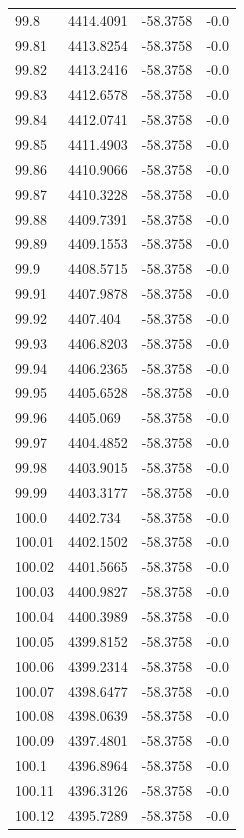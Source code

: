 \begin{table}[H]
\begin{tabular}{llll}
99.8 & 4414.4091 & -58.3758 & -0.0 \\
99.81 & 4413.8254 & -58.3758 & -0.0 \\
99.82 & 4413.2416 & -58.3758 & -0.0 \\
99.83 & 4412.6578 & -58.3758 & -0.0 \\
99.84 & 4412.0741 & -58.3758 & -0.0 \\
99.85 & 4411.4903 & -58.3758 & -0.0 \\
99.86 & 4410.9066 & -58.3758 & -0.0 \\
99.87 & 4410.3228 & -58.3758 & -0.0 \\
99.88 & 4409.7391 & -58.3758 & -0.0 \\
99.89 & 4409.1553 & -58.3758 & -0.0 \\
99.9 & 4408.5715 & -58.3758 & -0.0 \\
99.91 & 4407.9878 & -58.3758 & -0.0 \\
99.92 & 4407.404 & -58.3758 & -0.0 \\
99.93 & 4406.8203 & -58.3758 & -0.0 \\
99.94 & 4406.2365 & -58.3758 & -0.0 \\
99.95 & 4405.6528 & -58.3758 & -0.0 \\
99.96 & 4405.069 & -58.3758 & -0.0 \\
99.97 & 4404.4852 & -58.3758 & -0.0 \\
99.98 & 4403.9015 & -58.3758 & -0.0 \\
99.99 & 4403.3177 & -58.3758 & -0.0 \\
100.0 & 4402.734 & -58.3758 & -0.0 \\
100.01 & 4402.1502 & -58.3758 & -0.0 \\
100.02 & 4401.5665 & -58.3758 & -0.0 \\
100.03 & 4400.9827 & -58.3758 & -0.0 \\
100.04 & 4400.3989 & -58.3758 & -0.0 \\
100.05 & 4399.8152 & -58.3758 & -0.0 \\
100.06 & 4399.2314 & -58.3758 & -0.0 \\
100.07 & 4398.6477 & -58.3758 & -0.0 \\
100.08 & 4398.0639 & -58.3758 & -0.0 \\
100.09 & 4397.4801 & -58.3758 & -0.0 \\
100.1 & 4396.8964 & -58.3758 & -0.0 \\
100.11 & 4396.3126 & -58.3758 & -0.0 \\
100.12 & 4395.7289 & -58.3758 & -0.0 \\

\end{tabular}
\end{table}
